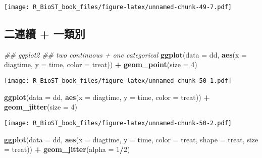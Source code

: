 \documentclass[
]{book}
\newenvironment{Shaded}{\begin{snugshade}}{\end{snugshade}}
\newcommand{\CommentTok}[1]{\textcolor[rgb]{0.56,0.35,0.01}{\textit{#1}}}
\newcommand{\DataTypeTok}[1]{\textcolor[rgb]{0.13,0.29,0.53}{#1}}
\newcommand{\DecValTok}[1]{\textcolor[rgb]{0.00,0.00,0.81}{#1}}
\newcommand{\KeywordTok}[1]{\textcolor[rgb]{0.13,0.29,0.53}{\textbf{#1}}}
\newcommand{\NormalTok}[1]{#1}
\newcommand{\OperatorTok}[1]{\textcolor[rgb]{0.81,0.36,0.00}{\textbf{#1}}}
\newcommand{\StringTok}[1]{\textcolor[rgb]{0.31,0.60,0.02}{#1}}
\begin{document}
\texttt{[image: R\_BioST\_book\_files/figure-latex/unnamed-chunk-49-7.pdf]}

\hypertarget{ux4e8cux9023ux7e8c-ux4e00ux985eux5225}{%
\subsection{二連續 + 一類別}\label{ux4e8cux9023ux7e8c-ux4e00ux985eux5225}}

\begin{Shaded}
\begin{Highlighting}[]
\CommentTok{\#\# ggplot2}
\CommentTok{\#\# two continuous + one categorical}
\KeywordTok{ggplot}\NormalTok{(}\DataTypeTok{data =}\NormalTok{ dd, }\KeywordTok{aes}\NormalTok{(}\DataTypeTok{x =}\NormalTok{ diagtime, }\DataTypeTok{y =}\NormalTok{ time, }\DataTypeTok{color =}\NormalTok{ treat)) }\OperatorTok{+}\StringTok{ }
\StringTok{  }\KeywordTok{geom\_point}\NormalTok{(}\DataTypeTok{size =} \DecValTok{4}\NormalTok{)}
\end{Highlighting}
\end{Shaded}

\texttt{[image: R\_BioST\_book\_files/figure-latex/unnamed-chunk-50-1.pdf]}

\begin{Shaded}
\begin{Highlighting}[]
\KeywordTok{ggplot}\NormalTok{(}\DataTypeTok{data =}\NormalTok{ dd, }\KeywordTok{aes}\NormalTok{(}\DataTypeTok{x =}\NormalTok{ diagtime, }\DataTypeTok{y =}\NormalTok{ time, }\DataTypeTok{color =}\NormalTok{ treat)) }\OperatorTok{+}\StringTok{ }
\StringTok{  }\KeywordTok{geom\_jitter}\NormalTok{(}\DataTypeTok{size =} \DecValTok{4}\NormalTok{)}
\end{Highlighting}
\end{Shaded}

\texttt{[image: R\_BioST\_book\_files/figure-latex/unnamed-chunk-50-2.pdf]}

\begin{Shaded}
\begin{Highlighting}[]
\KeywordTok{ggplot}\NormalTok{(}\DataTypeTok{data =}\NormalTok{ dd, }\KeywordTok{aes}\NormalTok{(}\DataTypeTok{x =}\NormalTok{ diagtime, }\DataTypeTok{y =}\NormalTok{ time, }
                      \DataTypeTok{color =}\NormalTok{ treat, }\DataTypeTok{shape =}\NormalTok{ treat, }\DataTypeTok{size =}\NormalTok{ treat)) }\OperatorTok{+}\StringTok{ }
\StringTok{  }\KeywordTok{geom\_jitter}\NormalTok{(}\DataTypeTok{alpha =} \DecValTok{1}\OperatorTok{/}\DecValTok{2}\NormalTok{) }
\end{Highlighting}
\end{Shaded}
\end{document}
